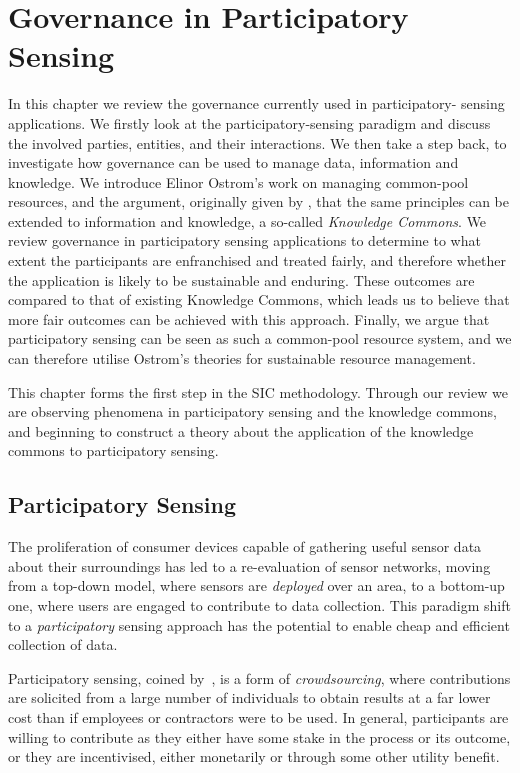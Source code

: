 \acresetall
\chapter{Governance in Participatory Sensing}\label{ch:kc}

In this chapter we review the governance currently used in participatory-
sensing applications. We firstly look at the participatory-sensing paradigm
and discuss the involved parties, entities, and their interactions. We then
take a step back, to investigate how governance can be used to manage data,
information and knowledge. We introduce Elinor Ostrom's work on managing
common-pool resources, and the argument, originally given by
\citet{Ostrom2003}, that the same principles can be extended to information
and knowledge, a so-called \emph{Knowledge Commons}. We review governance in participatory sensing
applications to determine to what extent the participants are enfranchised and
treated fairly, and therefore whether the application is likely to be
sustainable and enduring. These outcomes are compared to that of existing
Knowledge Commons, which leads us to believe that more fair outcomes can be
achieved with this approach. Finally, we argue that
participatory sensing can be seen as such a common-pool resource system, and we can
therefore utilise Ostrom's theories for sustainable resource
management. 

This chapter forms the first step in the \ac{SIC} methodology. Through our
review we are observing phenomena in participatory sensing and the knowledge
commons, and beginning to construct a theory about the application of the
knowledge commons to participatory sensing.

\section{Participatory Sensing}\label{sec:psense}

The proliferation of consumer devices capable of gathering useful sensor data
about their surroundings has led to a re-evaluation of sensor networks, moving
from a top-down model, where sensors are \emph{deployed} over an area, to a
bottom-up one, where users are engaged to contribute to data collection. This
paradigm shift to a \emph{participatory} sensing approach has the potential to
enable cheap and efficient collection of data.

Participatory sensing, coined by~\citet{Burke2006}, is a form of
\emph{crowdsourcing}, where contributions are solicited from a large number of
individuals to obtain results at a far lower cost than if employees or
contractors were to be used. In general, participants are willing to
contribute as they either have some stake in the process or its outcome, or
they are incentivised, either monetarily or through some other utility
benefit.

